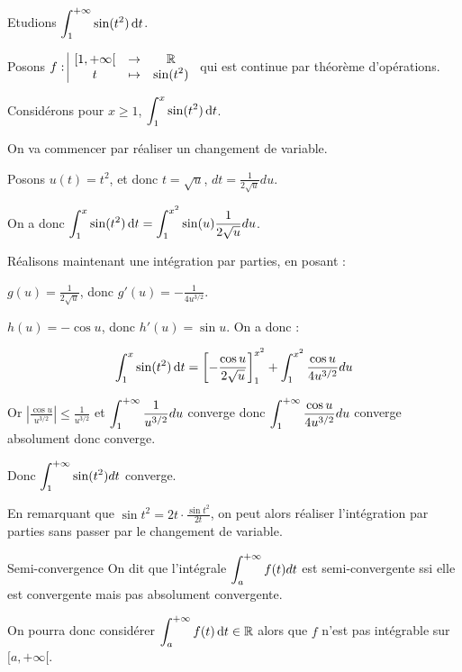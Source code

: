 \begin{exemple}
    Etudions $\displaystyle \int_{1}^{+ \infty } \sin(t^2) \,\mathrm{d}t$.

    Posons $f: \space \begin{array}{|ccc} \displaystyle [1, + \infty[ & \to & \displaystyle \mathbb{R} \\ \displaystyle t & \mapsto & \displaystyle \sin(t^2) \end{array}$ qui est continue par théorème d'opérations.

    Considérons pour $x \geqslant 1$, $\displaystyle \int_{1 }^{x } \sin(t^2) \,\mathrm{d}t$.

    On va commencer par réaliser un changement de variable.

    Posons $u(t) = t^2$, et donc $t = \sqrt u$, $dt = \frac{1}{2 \sqrt u} du$.

    On a donc $\displaystyle \int_{1 }^{x } \sin(t^2) \,\mathrm{d}t = \int_{1}^{x^2} \sin(u) \frac{1}{2 \sqrt u} du$.

    \avspace Réalisons maintenant une intégration par parties, en posant : 

    $g(u) = \frac{1}{2 \sqrt u}$, donc $g'(u) = - \frac{1}{4 u^{3/2}}$.

    $h(u) = - \cos u$, donc $h'(u) = \sin u$.
    On a donc :

    $$ \int_{1 }^{x } \sin(t^2) \,\mathrm{d}t = \left[ - \frac{\cos u}{2 \sqrt u} \right]_{1}^{x^2} + \int_{1}^{x^2} \frac{\cos u}{4 u^{3/2}} du $$

    Or $\left| \frac{\cos u  }{u^{3/2}} \right| \leqslant \frac{1}{u^{3/2}}$ et $\displaystyle \int_{1}^{+ \infty} \frac{1}{u^{3/2}} du$ converge donc
    $\displaystyle \int_{1}^{+ \infty} \frac{\cos u}{4 u^{3/2}} du$ converge absolument donc converge.

    Donc $\displaystyle \int_{1}^{+ \infty} \sin(t^2) dt$ converge.


    En remarquant que $\sin t^2 = 2t \cdot \frac{\sin t^2}{2t}$, on peut alors réaliser l'intégration par parties 
    sans passer par le changement de variable.
\end{exemple}


\begin{definition}{Semi-convergence}{}
    On dit que l'intégrale $\displaystyle \int_a^{+ \infty} f(t) dt$ est semi-convergente ssi elle 
    est convergente mais pas absolument convergente.

    On pourra donc considérer $\displaystyle \int_{a }^{+ \infty}  f(t) \,\mathrm{d}t \in \mathbb{R}$ alors 
    que $f$ n'est pas intégrable sur $[a, + \infty[$.
\end{definition}


